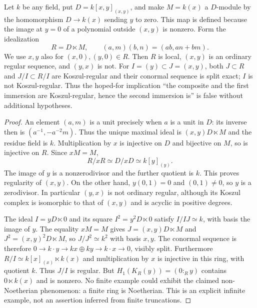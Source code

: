 \begin{example}\label{SA23-C-5}
Let $k$ be any field, put $D=k[x,y]_{(x,y)}$, and make $M=k(x)$ a
$D$-module by the homomorphism $D\to k(x)$ sending $y$ to zero.
This map is defined because the image at $y=0$ of a polynomial outside
$(x,y)$ is nonzero.  Form the idealization
\[
 R=D\ltimes M,\qquad
 (a,m)(b,n)=(ab,an+bm).
\]
We use $x,y$ also for $(x,0),(y,0)\in R$.  Then $R$ is local,
$(x,y)$ is an ordinary regular sequence, and $(y,x)$ is not.  For
$I=(y)\subset J=(x,y)$, both $J\subset R$ and $J/I\subset R/I$
are Koszul-regular and their conormal sequence is split exact; $I$ is
not Koszul-regular.  Thus the hoped-for implication
``the composite and the first immersion are Koszul-regular, hence the
second immersion is'' is false without additional hypotheses.
\end{example}
\begin{proof}
An element $(a,m)$ is a unit precisely when $a$ is a unit in $D$:
its inverse then is $(a^{-1},-a^{-2}m)$.  Thus the unique maximal ideal
is $(x,y)D\ltimes M$ and the residue field is $k$.
Multiplication by $x$ is injective on $D$ and bijective on $M$, so is
injective on $R$.  Since $xM=M$,
\[
 R/xR\simeq D/xD\simeq k[y]_{(y)}.
\]
The image of $y$ is a nonzerodivisor and the further quotient is $k$.
This proves regularity of $(x,y)$.  On the other hand, $y(0,1)=0$
and $(0,1)\ne0$, so $y$ is a zerodivisor.  In particular $(y,x)$
is not ordinary regular, although its Koszul complex is isomorphic
to that of $(x,y)$ and is acyclic in positive degrees.

The ideal $I=yD\ltimes0$ and its square $I^2=y^2D\ltimes0$ satisfy
$I/IJ\simeq k$, with basis the image of $y$.  The equality
$xM=M$ gives $J=(x,y)D\ltimes M$ and
$J^2=(x,y)^2D\ltimes M$, so $J/J^2\simeq k^2$ with basis $x,y$.
The conormal sequence is therefore
$0\to k\cdot y\to kx\oplus ky\to k\cdot x\to0$, visibly split.
Furthermore
$R/I\simeq k[x]_{(x)}\ltimes k(x)$ and multiplication by $x$ is
injective in this ring, with quotient $k$.  Thus $J/I$ is regular.
But $H_1(K_R(y))=(0:_R y)$ contains $0\ltimes k(x)$ and is nonzero.
No finite example could exhibit the claimed non-Noetherian phenomenon:
a finite ring is Noetherian.  This is an explicit infinite example,
not an assertion inferred from finite truncations.
\end{proof}

